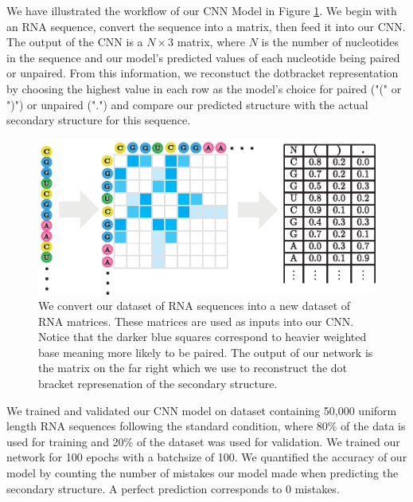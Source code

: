 \documentclass[11pt]{article}
\begin{document}
\begin{multicols}{2}
We have illustrated the workflow of our CNN Model in Figure \ref{fig:cnn_model}. We begin with an RNA sequence, convert the sequence into a matrix, then feed it into our CNN. The output of the CNN is a $N \times 3$ matrix, where $N$ is the number of nucleotides in the sequence and our model's predicted values of each nucleotide being paired or unpaired. From this information, we reconstuct the dotbracket representation by choosing the highest value in each row as the model's choice for paired ("(" or ")") or unpaired (".") and compare our predicted structure with the actual secondary structure for this sequence.
\end{multicols}

\begin{figure}[H]
\centering
\hspace*{-8cm}\includegraphics{fig/cnn_model_outline}
\caption{We convert our dataset of RNA sequences into a new dataset of RNA matrices. These matrices are used as inputs into our CNN. Notice that the darker blue squares correspond to heavier weighted base meaning more likely to be paired. The output of our network is the matrix on the far right which we use to reconstruct the dot bracket represenation of the secondary structure.}
\label{fig:cnn_model}
\end{figure}

\begin{multicols}{2}
We trained and validated our CNN model on dataset containing 50,000 uniform length RNA sequences following the standard condition, where 80\% of the data is used for training and 20\% of the dataset was used for validation. We trained our network for 100 epochs with a batchsize of 100. We quantified the accuracy of our model by counting the number of mistakes our model made when predicting the secondary structure. A perfect prediction corresponds to 0 mistakes.
\end{multicols}
\end{document}
